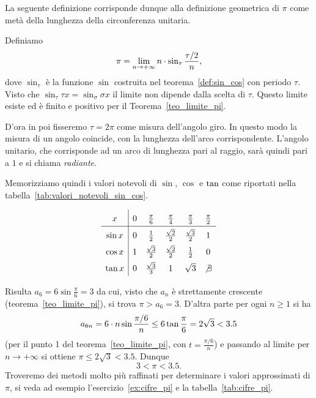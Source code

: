 La seguente definizione corrisponde dunque alla definizione 
geometrica di $\pi$ come metà della lunghezza della circonferenza unitaria.

\begin{definition}%
  \label{def:pi}%
Definiamo
\[
 \pi 
  = \lim_{n\to +\infty} n\cdot \sin_\tau \frac {\tau / 2}{n},
\]
dove $\sin_\tau$ è la funzione $\sin$ costruita nel 
teorema~\ref{def:sin_cos} con periodo $\tau$.
Visto che $\sin_\tau \tau x = \sin_\sigma \sigma x$ il limite 
non dipende dalla scelta di $\tau$.
Questo limite esiste ed è finito e positivo per il Teorema~\ref{teo_limite_pi}.
\end{definition}

D'ora in poi fisseremo $\tau = 2\pi$ come misura dell'angolo giro.
In questo modo la misura di un angolo coincide, con la lunghezza
dell'arco corrispondente. 
L'angolo unitario, che corrisponde ad un arco di lunghezza pari al raggio,
sarà quindi pari a $1$ e si chiama \emph{radiante}.
%

Memorizziamo quindi i valori notevoli di $\sin$, $\cos$ e $\tg$
come riportati nella tabella~\ref{tab:valori_notevoli_sin_cos}.
%
\begin{table}
  \centering
  \[
  \renewcommand{\arraystretch}{1.6}
  \begin{array}{c|ccccc}
    x      & 0 & \frac \pi 6 & \frac \pi 4 & \frac \pi 3 & \frac \pi 2 \\ \hline
    \sin x & 0 & \frac 1 2 & \frac{\sqrt 2}2 & \frac{\sqrt 3}2 & 1 \\
    \cos x & 1 & \frac{\sqrt 3}2 & \frac{\sqrt 2}2 & \frac 1 2 & 0 \\
    \tg x  & 0 & \frac{\sqrt 3}3 & 1 & \sqrt 3 & \not\exists
  \end{array}
  \]
  \caption{%
  Valori notevoli delle funzioni $\sin$, $\cos$ e $\tg$
  (si veda l'esercizio~\ref{ex:valori_notevoli_trigonometria}).}
  \label{tab:valori_notevoli_sin_cos}
\end{table}

Risulta $a_6 = 6 \sin \frac{\pi}{6} = 3$
da cui, visto che $a_n$ è strettamente crescente 
(teorema~\ref{teo_limite_pi}), si trova $\pi > a_6 = 3$.
D'altra parte per ogni $n\ge 1$ si ha 
\[
  a_{6n} = 6 \cdot n \sin \frac{\pi/6}{n} \le 6 \operatorname{tan} \frac{\pi}{6} = 2\sqrt 3 < 3.5
\]
(per il punto 1 del teorema~\ref{teo_limite_pi}, con $t=\frac{\pi/6}{n}$)
e passando al limite per $n\to+\infty$ si ottiene $\pi\le 2\sqrt 3<3.5$. 
Dunque 
\[
  3 < \pi < 3.5.
\]
Troveremo dei metodi molto più raffinati per determinare i valori approssimati 
di $\pi$, si veda ad esempio l'esercizio~\ref{ex:cifre_pi} e la 
tabella~\ref{tab:cifre_pi}.

